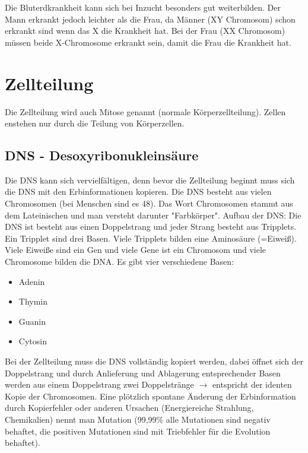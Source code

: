 \documentclass[a4paper]{article}
\begin{document}
\newline
\newline
Die Bluterdkrankheit kann sich bei Inzucht besonders gut weiterbilden. Der Mann erkrankt jedoch leichter als die Frau, da Männer (XY Chromosom) schon erkrankt sind wenn das X die Krankheit hat. Bei der Frau (XX Chromosom) müssen beide X-Chromosome erkrankt sein, damit die Frau die Krankheit hat.

\newpage

\section{Zellteilung}

Die Zellteilung wird auch Mitose genannt (normale Körperzellteilung). Zellen enstehen nur durch die Teilung von Körperzellen.

\subsection{DNS - Desoxyribonukleinsäure}

Die DNS kann sich vervielfältigen, denn bevor die Zellteilung beginnt muss sich die DNS mit den Erbinformationen kopieren.
\newline
\newline
Die DNS besteht aus vielen Chromosomen (bei Menschen sind es 48). Das Wort Chromosomen stammt aus dem Lateinischen und man versteht darunter "Farbkörper".
\newline
\newline
Aufbau der DNS:
\newline
\newline
Die DNS ist besteht aus einen Doppelstrang und jeder Strang besteht aus Tripplets. Ein Tripplet sind drei Basen. Viele Tripplets bilden eine Aminosäure (=Eiweiß). Viele Eiweiße sind ein Gen und viele Gene ist ein Chromosom und viele Chromosome bilden die DNA. 
\newline
\newline
Es gibt vier verschiedene Basen:
\newline
\newline
\begin{itemize}
\item Adenin
\item Thymin
\item Guanin
\item Cytosin
\end{itemize}

Bei der Zellteilung muss die DNS vollständig kopiert werden, dabei öffnet sich der Doppelstrang und durch Anlieferung und Ablagerung entsprechender Basen werden aus einem Doppelstrang zwei Doppelstränge $\rightarrow$ entspricht der identen Kopie der Chromosomen. Eine plötzlich spontane Änderung der Erbinformation durch Kopierfehler oder anderen Ursachen (Energiereiche Strahlung, Chemikalien) nennt man Mutation (99,99\% alle Mutationen sind negativ behaftet, die positiven Mutationen sind mit Triebfehler für die Evolution behaftet).
\end{document}
